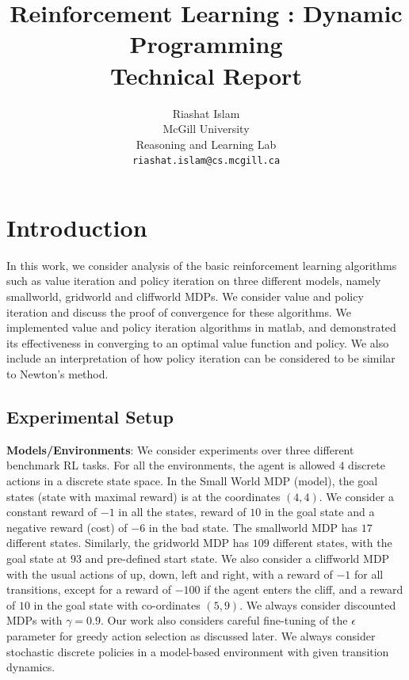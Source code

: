 \documentclass{article}\usepackage[]{graphicx}\usepackage[]{color}
\title{Reinforcement Learning : Dynamic Programming\\
Technical Report}
\author{
Riashat Islam\\
McGill University\\
Reasoning and Learning Lab\\
\texttt{riashat.islam@cs.mcgill.ca}
}
\let\Oldsection\section
\renewcommand{\section}{\FloatBarrier\Oldsection}
\let\Oldsubsection\subsection
\renewcommand{\subsection}{\FloatBarrier\Oldsubsection}
\theoremstyle{plain}
\begin{document}
\maketitle










\section{Introduction}

\noindent
In this work, we consider analysis of the basic reinforcement learning algorithms such as value iteration and policy iteration on three different models, namely smallworld, gridworld and cliffworld MDPs. We consider value and policy iteration and discuss the proof of convergence for these algorithms. We implemented value and policy iteration algorithms in matlab, and demonstrated its effectiveness in converging to an optimal value function and policy. We also include an interpretation of how policy iteration can be considered to be similar to Newton's method.



\subsection{Experimental Setup}

\noindent
\noindent
\textbf{Models/Environments}: We consider experiments over three different benchmark RL tasks. For all the environments, the agent is allowed $4$ discrete actions in a discrete state space. In the Small World MDP (model), the goal states (state with maximal reward) is at the coordinates $(4,4)$. We consider a constant reward of $-1$ in all the states, reward of $10$ in the goal state and a negative reward (cost) of $-6$ in the bad state. The smallworld MDP has $17$ different states. Similarly, the gridworld MDP has $109$ different states, with the goal state at $93$ and pre-defined start state. We also consider a cliffworld MDP with the usual actions of up, down, left and right, with a reward of $-1$ for all transitions, except for a reward of $-100$ if the agent enters the cliff, and a reward of $10$ in the goal state with co-ordinates $(5,9)$. We always consider discounted MDPs with $\gamma=0.9$. Our work also considers careful fine-tuning of the $\epsilon$ parameter for greedy action selection as discussed later. We always consider stochastic discrete policies in a model-based environment with given transition dynamics. 
\end{document}
